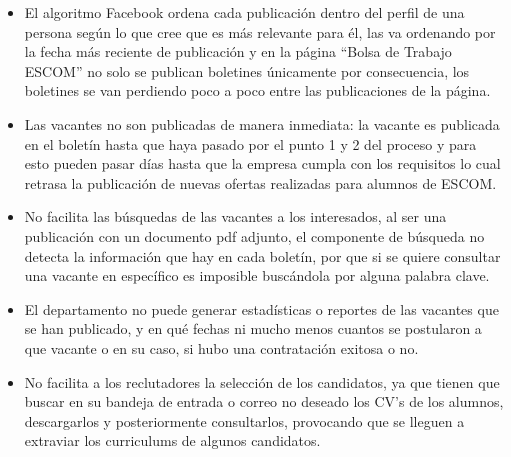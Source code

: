 \begin{itemize}
    \item El algoritmo Facebook ordena cada publicación dentro del perfil de una persona según lo que cree que es más relevante para él, las va ordenando por la fecha más reciente de publicación y en la página ``Bolsa de Trabajo ESCOM'' no solo se publican boletines únicamente por consecuencia, los boletines se van perdiendo poco a poco entre las publicaciones de la página.

    \item Las vacantes no son publicadas de manera inmediata: la vacante es publicada en el boletín hasta que haya pasado por el punto 1 y 2 del proceso y para esto pueden pasar días hasta que la empresa cumpla con los requisitos lo cual retrasa la publicación de nuevas ofertas realizadas para alumnos de ESCOM.

    \item No facilita  las búsquedas de las vacantes a los interesados, al ser una publicación con un documento pdf adjunto, el componente de búsqueda no detecta la información que hay en cada boletín, por  que si se quiere consultar una vacante en específico es imposible buscándola por alguna palabra clave.

    \item El departamento no puede generar estadísticas o reportes de las vacantes que se han publicado, y en qué fechas ni mucho menos cuantos se postularon a que vacante o en su caso, si hubo una contratación exitosa o no. 

    \item No facilita  a los reclutadores la selección de los candidatos, ya que tienen que buscar en su bandeja de entrada o correo no deseado los CV’s de los alumnos, descargarlos y posteriormente consultarlos, provocando que se lleguen a extraviar los curriculums de algunos candidatos.

\end{itemize}